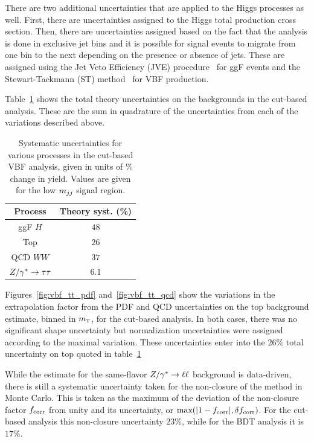 There are two additional uncertainties that are applied to the Higgs processes as well. First, there are uncertainties assigned to the Higgs total production cross section. Then, there are uncertainties assigned based on the fact that the analysis is done in exclusive jet bins and it is possible for signal events to migrate from one bin to the next depending on the presence or absence of jets. These are assigned using the Jet Veto Efficiency (JVE) procedure~\cite{JVE} for ggF events and the Stewart-Tackmann (ST) method~\cite{ST} for VBF production. 


Table~\ref{tab:vbf_cb_theosys} shows the total theory uncertainties on the backgrounds in the cut-based analysis. These are the sum in quadrature of the uncertainties from each of the variations described above. 

\begin{table}[h!]
\centering
\captionsetup{justification=centering}
\begin{tabular}{|c|c|}
\hline
Process & Theory syst. (\%)  \\ \hline
ggF $H$ & $48$ \\ \hline
Top & $26$ \\ \hline
QCD $WW$ & $37$ \\ \hline
$Z/\gamma^{\ast} \to \tau\tau$ & $6.1$ \\ \hline
\end{tabular}
\caption{Systematic uncertainties for various processes in the cut-based VBF analysis, given in units of \% change in yield. Values are given for the low $m_{jj}$ signal region.}
\label{tab:vbf_cb_theosys}
\end{table}

Figures~\ref{fig:vbf_tt_pdf} and~\ref{fig:vbf_tt_qcd} show the variations in the extrapolation factor from the PDF and QCD uncertainties on the top background estimate, binned in $m_{\textrm{\footnotesize\sc t}}$, for the cut-based analysis. In both cases, there was no significant shape uncertainty but normalization uncertainties were assigned according to the maximal variation. These uncertainties enter into the $26\%$ total uncertainty on top quoted in table~\ref{tab:vbf_cb_theosys}

While the estimate for the same-flavor $Z/\gamma^{\ast}\to\ell\ell$ background is data-driven, there is still a systematic uncertainty taken for the non-closure of the method in Monte Carlo. This is taken as the maximum of the deviation of the non-closure factor $f_{\rm corr}$ from unity and its uncertainty, or $\textrm{max}(|1 - f_{\rm corr}|, \delta f_{\rm corr})$. For the cut-based analysis this non-closure uncertainty $23$\%, while for the BDT analysis it is $17\%$.

